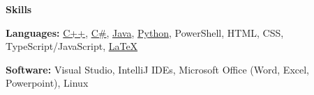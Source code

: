 \documentclass[10pt]{article}
\newlength{\headingborderwidth}
\newcommand{\resheading}[1]{
    \begin{mdframed}[
        backgroundcolor=black!15,
        linewidth=\headingborderwidth,
        innertopmargin=4pt,
        innerbottommargin=4pt,
        skipabove=6pt,
        skipbelow=2pt]
        \textbf{\large #1}
    \end{mdframed}
}
\newcommand{\ressubheading}[4]{
    \textbf{#1} \hfill #2 \\[0pt]
    \textit{#3} \hfill #4 \\[0pt]
}
\newenvironment{resitemize}{
    \vspace{-6pt}
    \begin{itemize}
    \setlength\itemsep{-2pt}
}{
    \end{itemize}
}
\begin{document}
\begin{NoHyper}
\begin{resitemize}
    \end{resitemize}


%
%

\resheading{Skills}

\textbf{Languages:}
    \href{https://en.wikipedia.org/wiki/C\%2B\%2B}{C++},
    \href{https://en.wikipedia.org/wiki/C_Sharp_(programming_language)}{C\#},
    \href{https://en.wikipedia.org/wiki/Java_(programming_language)}{Java},
    \href{https://www.python.org/}{Python},
    PowerShell,
    HTML, CSS, TypeScript/JavaScript,
    \href{https://www.latex-project.org/}{\LaTeX}

\textbf{Software:}
    Visual Studio,
    IntelliJ IDEs,
    Microsoft Office (Word, Excel, Powerpoint),
    Linux


\end{NoHyper}
\end{document}
